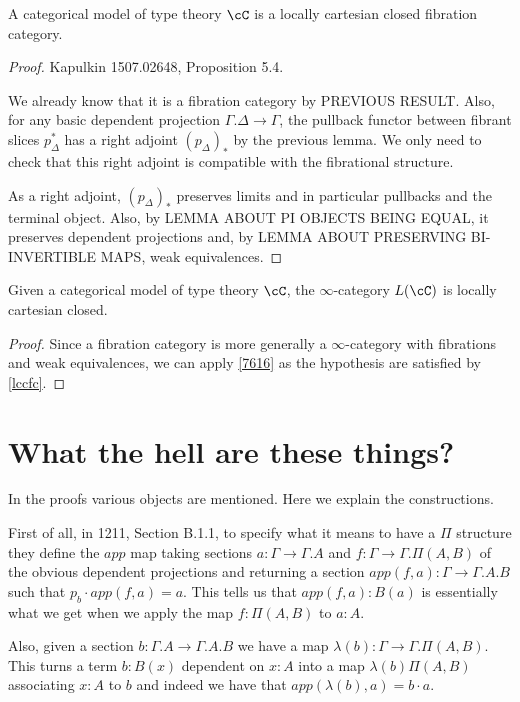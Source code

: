 \documentclass[a4paper,fontsize=12pt]{scrartcl}
\begin{document}
\begin{prop}\label{lccfc}
  A categorical model of type theory $\cC$ is a locally cartesian closed
  fibration category.
\end{prop}
\begin{proof}
  Kapulkin 1507.02648, Proposition 5.4.

  We already know that it is a
  fibration category by PREVIOUS RESULT. Also, for any basic dependent projection
  $\Gamma.\Delta\rightarrow\Gamma$, the pullback functor between fibrant slices
  $p^*_\Delta$ has a right adjoint $(p_\Delta)_*$ by the previous lemma.
  We only need to check that this right adjoint is
  compatible with the fibrational structure.

  As a right adjoint, $(p_\Delta)_*$ preserves limits and in particular pullbacks and
  the terminal object. Also, by LEMMA ABOUT PI OBJECTS BEING EQUAL, it preserves
  dependent projections and, by LEMMA ABOUT PRESERVING BI-INVERTIBLE MAPS, weak
  equivalences.
\end{proof}

\begin{thm}
  Given a categorical model of type theory $\cC$, the $\infty$-category $L(\cC)$
  is locally cartesian closed.
\end{thm}
\begin{proof}
  Since a fibration category is more generally a $\infty$-category with
  fibrations and weak equivalences, we can apply \ref{7616} as the hypothesis
  are satisfied by \ref{lccfc}.
\end{proof}

\section{What the hell are these things?}

In the proofs various objects are mentioned. Here we explain the constructions.

First of all, in 1211, Section B.1.1, to specify what it means to have a $\Pi$
structure they define the $app$ map taking sections
$a\colon\Gamma\rightarrow\Gamma.A$ and $f\colon\Gamma\rightarrow\Gamma.\Pi(A,B)$
of the obvious dependent projections and returning a section
$app(f,a)\colon\Gamma\rightarrow\Gamma.A.B$ such that $p_b\cdot app(f,a)=a$.
This tells us that $app(f,a):B(a)$ is essentially what we get when we apply the
map $f:\Pi(A,B)$ to $a:A$.

Also, given a section $b\colon\Gamma.A\rightarrow\Gamma.A.B$ we have a map
$\lambda(b)\colon\Gamma\rightarrow\Gamma.\Pi(A,B)$. This turns a term $b:B(x)$
dependent on $x:A$ into a map $\lambda(b)\Pi(A,B)$ associating $x:A$ to $b$ and
indeed we have that $app(\lambda(b),a)=b\cdot a$.
\end{document}
